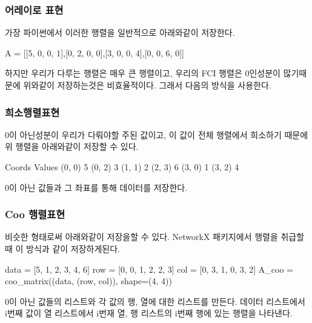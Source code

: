 \documentclass[11pt]{article}
\begin{document}
\subsubsection*{어레이로 표현}
가장 파이썬에서 이러한 행렬을 일반적으로 아래와같이 저장한다. 
\begin{CodeBox}[title={Example: Python snippet}]
A = [[5, 0, 0, 1],[0, 2, 0, 0],[3, 0, 0, 4],[0, 0, 6, 0]]
\end{CodeBox}
하지만 우리가 다루는 행렬은 매우 큰 행렬이고, 우리의 FCI 행렬은 0인성분이 많기때문에 위와같이 저장하는것은 비효율적이다. 
그래서 다음의 방식을 사용한다. 

\subsubsection*{희소행렬표현}
0이 아닌성분이 우리가 다뤄야할 주된 값이고, 이 값이 전체 행렬에서 희소하기 때문에 위 행렬을 아래와같이 저장할 수 있다. 
\begin{CodeBox}[title={Example: Python snippet}]
Coords  Values
(0, 0)  5
(0, 2)  3
(1, 1)  2
(2, 3)  6
(3, 0)  1
(3, 2)  4
\end{CodeBox}

0이 아닌 값들과 그 좌표를 통해 데이터를 저장한다. 

\subsubsection*{Coo 행렬표현}
비슷한 형태로써 아래와같이 저장을할 수 있다. NetworkX 패키지에서 행렬을 취급할때 이 방식과 같이 저장하게된다. 
\begin{CodeBox}[title={Example: Python snippet}]
data = [5, 1, 2, 3, 4, 6]
row  = [0, 0, 1, 2, 2, 3]
col  = [0, 3, 1, 0, 3, 2]
A_coo = coo_matrix((data, (row, col)), shape=(4, 4))
\end{CodeBox}
0이 아닌 값들의 리스트와 각 값의 행, 열에 대한 리스트를 만든다.
데이터 리스트에서 i번째 값이 열 리스트에서 i번재 열, 행 리스트의 i번째 행에 있는 행렬을 나타낸다. 
\end{document}
